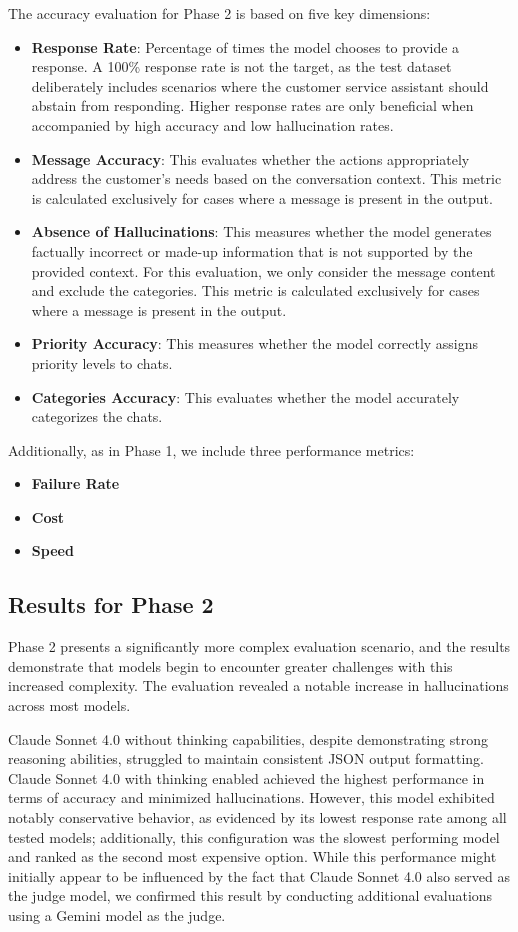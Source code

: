 The accuracy evaluation for Phase 2 is based on five key dimensions:
\begin{itemize}
    \item \textbf{Response Rate}: Percentage of times the model chooses to provide a response. A 100\% response rate is not the target, as the test dataset deliberately includes scenarios where the customer service assistant should abstain from responding. Higher response rates are only beneficial when accompanied by high accuracy and low hallucination rates.
    \item \textbf{Message Accuracy}: This evaluates whether the actions appropriately address the customer's needs based on the conversation context. This metric is calculated exclusively for cases where a message is present in the output.
    \item \textbf{Absence of Hallucinations}: This measures whether the model generates factually incorrect or made-up information that is not supported by the provided context. For this evaluation, we only consider the message content and exclude the categories. This metric is calculated exclusively for cases where a message is present in the output.
    \item \textbf{Priority Accuracy}: This measures whether the model correctly assigns priority levels to chats.
    \item \textbf{Categories Accuracy}: This evaluates whether the model accurately categorizes the chats.
\end{itemize}
Additionally, as in Phase 1, we include three performance metrics:
\begin{itemize}
    \item \textbf{Failure Rate}
    \item \textbf{Cost}
    \item \textbf{Speed}
\end{itemize}

\subsection{Results for Phase 2}

Phase 2 presents a significantly more complex evaluation scenario, and the results demonstrate that models begin to encounter greater challenges with this increased complexity.
The evaluation revealed a notable increase in hallucinations across most models.

Claude Sonnet 4.0 without thinking capabilities, despite demonstrating strong reasoning abilities, struggled to maintain consistent JSON output formatting.
Claude Sonnet 4.0 with thinking enabled achieved the highest performance in terms of accuracy and minimized hallucinations.
However, this model exhibited notably conservative behavior, as evidenced by its lowest response rate among all tested models; additionally, this configuration was the slowest performing model and ranked as the second most expensive option.
While this performance might initially appear to be influenced by the fact that Claude Sonnet 4.0 also served as the judge model, we confirmed this result by conducting additional evaluations using a Gemini model as the judge.

